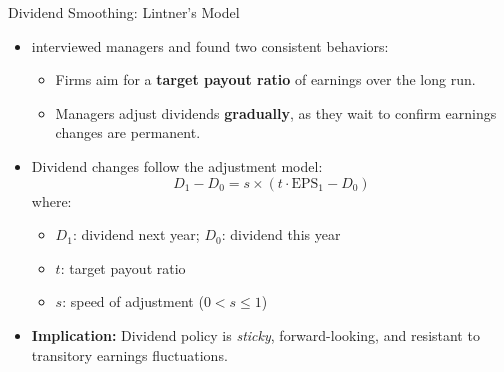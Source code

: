 \begin{frame}{Dividend Smoothing: Lintner's Model}
\footnotesize
\begin{itemize}
    \item \textbf{\textcite{lintner1956distribution}} interviewed managers and found two consistent behaviors:
    \begin{itemize}
        \item Firms aim for a \textbf{target payout ratio} of earnings over the long run.
        \item Managers adjust dividends \textbf{gradually}, as they wait to confirm earnings changes are permanent.
    \end{itemize}

    \vspace{2mm}
    \item Dividend changes follow the adjustment model:
    \[
    D_1 - D_0 = s \times (t \cdot \text{EPS}_1 - D_0)
    \]
    where:
    \begin{itemize}
        \item $D_1$: dividend next year; $D_0$: dividend this year
        \item $t$: target payout ratio
        \item $s$: speed of adjustment ($0 < s \leq 1$)
    \end{itemize}

    \vspace{2mm}
    \item \textbf{Implication:} Dividend policy is \textit{sticky}, forward-looking, and resistant to transitory earnings fluctuations.
\end{itemize}
\end{frame}

